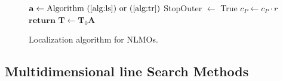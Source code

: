 \documentclass[aps,prl,reprint,amsmath,amssymb]{revtex4-1}
\begin{document}
\begin{figure}
\begin{algorithm}[H]
\begin{algorithmic}[1]
			    \State $\mathbf{a} \gets \text{Algorithm~(\ref{alg:ls}) or~(\ref{alg:tr})}$ 
			\EndIf
			\State StopOuter $\gets$ True
		\EndIf
			\State $c_{P} \gets c_P \cdot r$ 
		\EndIf
	\State $\mathbf{return}$ $\mathbf{T} \gets \mathbf{T}_0 \mathbf{A} $ 
   \end{algorithmic}
\end{algorithm}
\caption{\label{fig:loc_algor} Localization  algorithm for NLMOs.}
\end{figure}


\subsection{Multidimensional line Search Methods}
\end{document}
